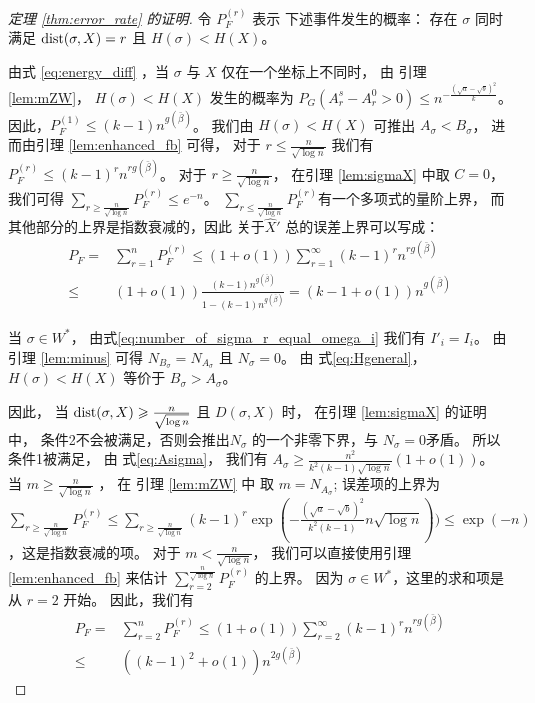 \begin{proof}[定理 \ref{thm:error_rate} 的证明]

	令 $P_F^{(r)}$ 表示
  下述事件发生的概率：
  存在 $\sigma$ 同时满足
  $\operatorname{dist}(\sigma, X) = r$ 且
  $H(\sigma) < H(X)$。
	
	由式 \eqref{eq:energy_diff} ，当
  $\sigma$ 与 $X$ 仅在一个坐标上不同时，
  由 引理 \ref{lem:mZW}，
  $H(\sigma) < H(X)$ 发生的概率为
	$P_G(A_r^s - A_r^0 > 0) \leq n^{-\frac{\left(\sqrt{a} - \sqrt{b}\right)^2}{k}}$。
  因此，$P_F^{(1)}  \leq (k-1)n^{g(\bar{\beta})}$。
	我们由 $H(\sigma) < H(X)$ 可推出 $A_{\sigma} < B_{\sigma}$，
  进而由引理 \ref{lem:enhanced_fb} 
  可得，
  对于 $ r \leq \frac{n}{\sqrt{\log n}}$
  我们有
  $P_F^{(r)} \leq (k-1)^r n^{rg(\bar{\beta})}$。
	对于
  $ r \geq \frac{n}{\sqrt{\log n}}$， 在引理
 \ref{lem:sigmaX} 中取 $C=0$，我们可得
  $\sum_{r\geq \frac{n}{\sqrt{\log n}}}P_F^{(r)} \leq e^{-n}$。
	$\sum_{r\leq \frac{n}{\sqrt{\log n}}}P_F^{(r)}$有一个多项式的量阶上界，
  而其他部分的上界是指数衰减的，因此
  关于$\hat{X}'$ 总的误差上界可以写成：
  \begin{align*}
	P_F = & \sum_{r=1}^n P_F^{(r)} \leq (1+o(1)) \sum_{r=1}^{\infty} (k-1)^r n^{rg(\bar{\beta})}\\
	\leq & (1+o(1))\frac{(k-1) n^{g(\bar{\beta})}}{1-(k-1) n^{g(\bar{\beta})}} = (k-1+o(1))n^{g(\bar{\beta})}
	\end{align*}   
	
当 $\sigma \in W^*$， 由式\eqref{eq:number_of_sigma_r_equal_omega_i}
 我们有 $I'_i = I_i$。
由 引理 \ref{lem:minus} 可得
$N_{B_{\sigma}} = 
N_{A_{\sigma}}$
且 $N_{\sigma} = 0$。
由 式\eqref{eq:Hgeneral}，
$H(\sigma) < H(X)$ 等价于
$B_{\sigma} > A_{\sigma}$。

因此，
当 $ \operatorname{dist}(\sigma, X) \geqslant \frac{n}{\sqrt{\log n} }$ 且 $D(\sigma, X)$
时，
在引理 \ref{lem:sigmaX} 的证明中，
条件2不会被满足，否则会推出$N_{\sigma}$
的一个非零下界，与  $N_{\sigma} = 0$矛盾。
所以条件1被满足，
由 式\eqref{eq:Asigma}，
我们有 $A_{\sigma} \geq \frac{n^2}{k^2(k-1)\sqrt{\log n} } (1+o(1))$。
当 $m \geq \frac{n}{ \sqrt{\log n}}$ ，
在 引理 \ref{lem:mZW}  中 取
$m=N_{A_{\sigma}}$;
误差项的上界为 $\sum_{r\geq \frac{n}{ \sqrt{\log n}}} P_F^{(r)} \leq \sum_{r\geq \frac{n}{ \sqrt{\log n}}} (k-1)^r \exp(-\frac{\left(\sqrt{a} - \sqrt{b}\right)^2}{k^2(k-1)} n \sqrt{\log n}))
\leq \exp(-n)$，这是指数衰减的项。
对于 $m < \frac{n}{ \sqrt{\log n}}$，
我们可以直接使用引理 \ref{lem:enhanced_fb}   
来估计 $\sum_{r=2}^{\frac{n}{ \sqrt{\log n}}} P_F^{(r)}$
的上界。
因为 $\sigma \in W^*$，这里的求和项是从 $r=2$ 开始。
因此，我们有
\begin{align*}
P_F = & \sum_{r=2}^n P_F^{(r)} \leq (1+o(1)) \sum_{r=2}^{\infty} (k-1)^r n^{rg(\bar{\beta})}\\
\leq & \left((k-1)^2+o(1)\right)n^{2g(\bar{\beta})}
\end{align*}
\end{proof}